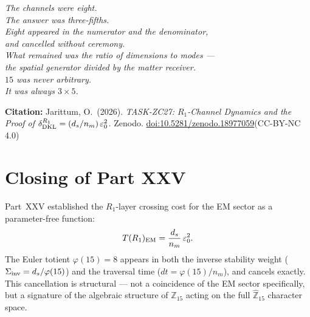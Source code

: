 \documentclass[12pt, a4paper]{article}
\begin{document}
\bigskip
\begin{center}
\textit{%
  The channels were eight.\\
  The answer was three-fifths.\\[0.5em]
  Eight appeared in the numerator and the denominator,\\
  and cancelled without ceremony.\\[0.5em]
  What remained was the ratio of dimensions to modes ---\\
  the spatial generator divided by the matter receiver.\\[0.5em]
  $15$ was never arbitrary.\\
  It was always $3 \times 5$.%
}
\end{center}

\bigskip
\begin{center}
\textbf{Citation:} Jarittum, O.\ (2026).
\textit{TASK-ZC27: $R_1$-Channel Dynamics and the Proof of
$\delta_{\rm DKL}^{R_1} = (d_s/n_m)\,\varepsilon_0^2$.}
Zenodo. \href{https://doi.org/10.5281/zenodo.18977059}%
{doi:10.5281/zenodo.18977059}\quad (CC-BY-NC 4.0)
\end{center}

\bigskip


\section*{Closing of Part XXV}

Part~XXV established the $R_1$-layer crossing cost for the EM
sector as a parameter-free function:
\[
  T(R_1)_{\rm EM} = \frac{d_s}{n_m}\,\varepsilon_0^2.
\]
The Euler totient $\varphi(15) = 8$ appears in both the inverse
stability weight ($\Sigma_{\rm inv} = d_s/\varphi(15)$) and the
traversal time ($dt = \varphi(15)/n_m$), and cancels exactly. This
cancellation is structural --- not a coincidence of the EM sector
specifically, but a signature of the algebraic structure of
$\mathbb{Z}_{15}$ acting on the full $\widehat{\mathbb{Z}}_{15}$
character space.
\end{document}
